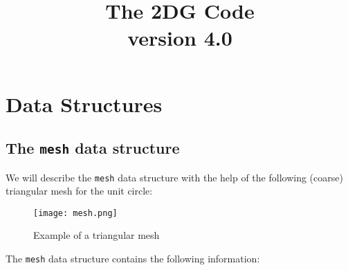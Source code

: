 \documentclass[11pt]{article}
\title{The 2DG Code \\ \small{version 4.0}}
\date{}
\begin{document}
\maketitle

\section{Data Structures}


\subsection{The \texttt{mesh} data structure}

 We will describe the  \texttt{mesh} data structure with the help of the following (coarse) triangular mesh for the unit circle:
 
\begin{figure}[h]	
\begin{center}
	\texttt{[image: mesh.png]} 
	\end{center}
		\caption{Example of a triangular mesh}
		 \label{meshlinear}
	\end{figure}

The  \texttt{mesh} data structure contains the following information:
\end{document}
